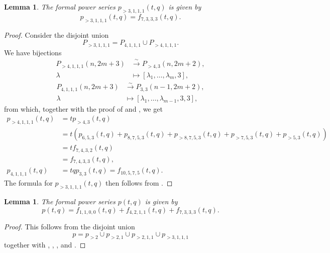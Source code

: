 \documentclass[a4paper, 12pt, reqno]{amsart}
\newtheorem{lemma}[theorem]{Lemma}
\theoremstyle{remark}
\numberwithin{equation}{subsection}
\begin{document}
\begin{lemma}
  \label{lmm:39}
  The formal power series $p_{>3, 1, 1, 1}(t, q)$ is given by
  \begin{equation*}
    p_{>3, 1, 1, 1}(t, q) = f_{7, 3, 3, 3}(t, q).
  \end{equation*}
\end{lemma}

\begin{proof}
  Consider the disjoint union
  \begin{equation*}
    P_{>3, 1, 1, 1} = P_{4, 1, 1, 1} \cup P_{>4, 1, 1, 1}.
  \end{equation*}
  We have bijections
  \begin{align*}
    P_{>4, 1, 1, 1}(n, 2m + 3) &\xrightarrow{\sim} P_{>4, 3}(n, 2m + 2), \\
    \lambda &\mapsto [\lambda_1, \dots, \lambda_m, 3],
  \end{align*}
  \begin{align*}
    P_{4, 1, 1, 1}(n, 2m + 3) &\xrightarrow{\sim} P_{3, 3}(n - 1, 2m + 2), \\
    \lambda &\mapsto [\lambda_1, \dots, \lambda_{m - 1}, 3, 3],
  \end{align*}
  from which, together with the proof of  and , we get
  \begin{align*}
    p_{>4, 1, 1, 1}(t, q) &= tp_{>4, 3}(t, q) \\
    &= t(p_{6, 5, 3}(t, q) + p_{8, 7, 5, 3}(t, q) + p_{>8, 7, 5, 3}(t, q) + p_{>7, 5, 3}(t, q) + p_{>5, 3}(t, q)) \\
    &= tf_{7, 4, 3, 2}(t, q) \\
    &= f_{7, 4, 3, 3}(t, q), \\
    p_{4, 1, 1, 1}(t, q) &= tqp_{3, 3}(t, q) = f_{10, 5, 7, 5}(t, q).
  \end{align*}
  The formula for $p_{>3, 1, 1, 1}(t, q)$ then follows from .
\end{proof}

\begin{lemma}
  \label{lmm:40}
  The formal power series $p(t, q)$ is given by
  \begin{equation*}
    p(t, q) = f_{1, 1, 0, 0}(t, q) + f_{4, 2, 1, 1}(t, q) + f_{7, 3, 3, 3}(t, q).
  \end{equation*}
\end{lemma}

\begin{proof}
  This follows from the disjoint union
  \begin{equation*}
    p = p_{>2} \cup p_{>2, 1} \cup p_{>2, 1, 1} \cup p_{>3, 1, 1, 1}
  \end{equation*}
  together with , , ,  and .
\end{proof}
\end{document}
